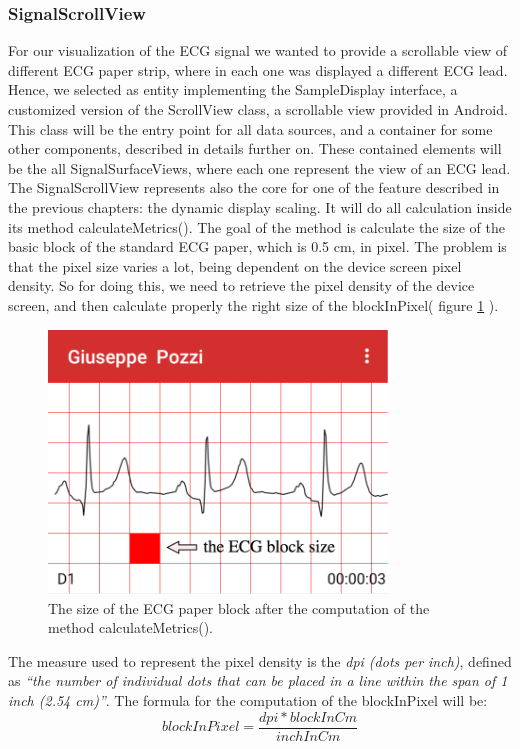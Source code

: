 \subsubsection{SignalScrollView}
For our visualization of the ECG signal we wanted to provide a scrollable view of different ECG paper strip, where in each one was displayed a different ECG lead. Hence, we selected as entity implementing the SampleDisplay interface, a customized version of the ScrollView class, a scrollable view provided in Android. This class will be the entry point for all data sources, and a container for some other components, described in details further on. These contained elements will be the all SignalSurfaceViews, where each one represent the view of an ECG lead. The SignalScrollView represents also the core for one of the feature described in the previous chapters: the dynamic display scaling. It will do all calculation inside its method calculateMetrics(). The goal of the method is calculate the size of the basic block of the standard ECG paper, which is 0.5 cm, in pixel. The problem is that the pixel size varies a lot, being dependent on the device screen pixel density. So for doing this, we need to retrieve the pixel density of the device screen, and then calculate properly the right size of the blockInPixel( figure \ref{fig9.7} ). 
\begin{figure}[ht!]
	\centering
	\includegraphics[width=90mm]{figures/ch9/7.png}
	\caption{The size of the ECG paper block after the computation of the method calculateMetrics().}
	\label{fig9.7}
\end{figure}
The measure used to represent the pixel density is the \textit{dpi (dots per inch)}, defined as \textit{“the number of individual dots that can be placed in a line within the span of 1 inch (2.54 cm)”}.\cite{ref24} The formula for the computation of the blockInPixel will be:
\begin{equation}
	blockInPixel=\frac{dpi*blockInCm}{inchInCm}
\end{equation}
